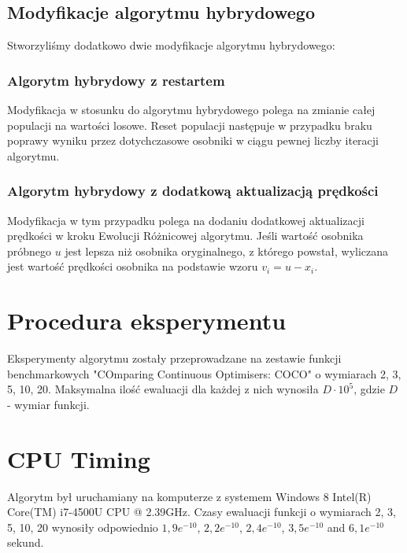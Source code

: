 \documentclass{article}
\begin{document}
\subsection{Modyfikacje algorytmu hybrydowego}
Stworzyliśmy dodatkowo dwie modyfikacje algorytmu hybrydowego:
\subsubsection{Algorytm hybrydowy z restartem}
Modyfikacja w stosunku do algorytmu hybrydowego polega na zmianie całej populacji na wartości losowe. Reset populacji następuje w przypadku braku poprawy wyniku przez dotychczasowe osobniki w ciągu pewnej liczby iteracji algorytmu.
\subsubsection{Algorytm hybrydowy z dodatkową aktualizacją prędkości}
Modyfikacja w tym przypadku polega na dodaniu dodatkowej aktualizacji prędkości w kroku Ewolucji Różnicowej algorytmu. Jeśli wartość osobnika próbnego $u$ jest lepsza niż osobnika oryginalnego, z którego powstał, wyliczana jest wartość prędkości osobnika na podstawie wzoru $v_i=u - x_i$.
 \section{Procedura eksperymentu}
Eksperymenty algorytmu zostały przeprowadzane na zestawie funkcji benchmarkowych "COmparing Continuous Optimisers: COCO" o wymiarach 2, 3, 5, 10, 20. Maksymalna ilość ewaluacji dla każdej z nich wynosiła $D \cdot 10^5$, gdzie $D$ - wymiar funkcji. 
 \section{CPU Timing}
Algorytm był uruchamiany na komputerze z systemem Windows 8 Intel(R) Core(TM) i7-4500U CPU @ 2.39GHz. Czasy ewaluacji funkcji o wymiarach 2, 3, 5, 10, 20 wynosiły odpowiednio $1,9e^{-10}$, $2,2e^{-10}$, $2,4e^{-10}$, $3,5e^{-10}$ and $6,1e^{-10}$ sekund. 

\end{document}
